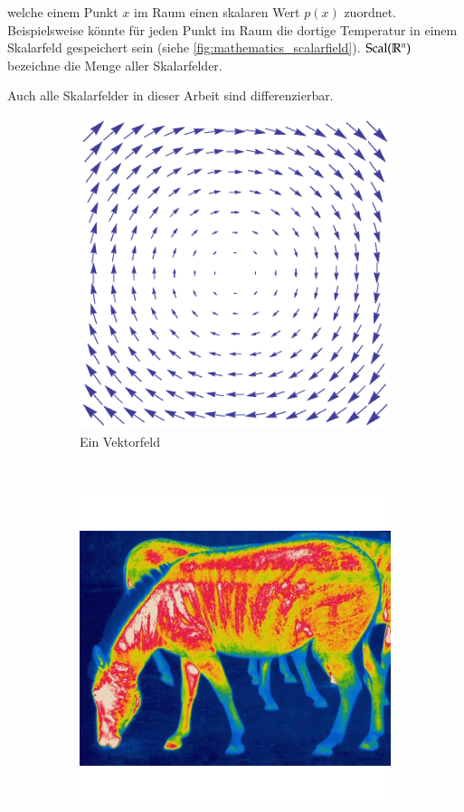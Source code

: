 welche einem Punkt $x$ im Raum einen skalaren Wert $p(x)$
zuordnet. Beispielsweise könnte für jeden Punkt im Raum die dortige
Temperatur in einem Skalarfeld gespeichert sein (siehe
\cref{fig:mathematics_scalarfield}).
$\operatorname*{Scal}(\mathbb{R}^n)$ bezeichne die Menge aller
Skalarfelder.

Auch alle Skalarfelder in dieser Arbeit sind differenzierbar.

\begin{figure}
	\begin{subfigure}[t]{0.5\textwidth}
		\centering
		\includegraphics[width=\textwidth]{images/vectorfield}
		\caption{Ein Vektorfeld}
\label{fig:mathematics_vectorfield}
	\end{subfigure}
~
	\begin{subfigure}[t]{0.5\textwidth}
		\centering
		\includegraphics[width=\textwidth]{images/thermal_imaging}

\end{subfigure}
\end{figure}
